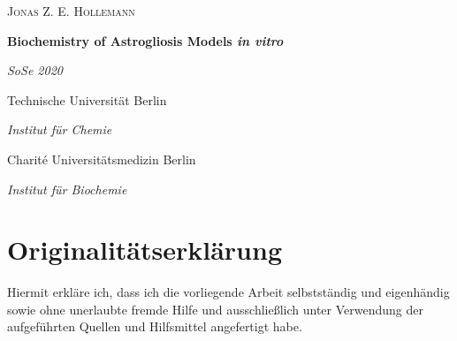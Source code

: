 \documentclass[a4paper,11pt,bibtotocnumbered]{article}
\begin{document}
\begin{titlepage}
	{\scshape\Large Jonas Z. E. Hollemann \par}
	\vspace{1.5cm}
	{\huge\bfseries Biochemistry of Astrogliosis Models \textit{in vitro}  \par}
	\vspace{2cm}
	{\Large\itshape SoSe 2020 \par}
	\vspace{2cm}
	{\Large Technische Universität Berlin \par}
	\vspace{.5cm}
	{\Large\itshape Institut für Chemie \par}
	\vspace{2cm}
	{\Large Charité Universitätsmedizin Berlin\par}
	\vspace{.5cm}
	{\Large\itshape Institut für Biochemie \par}
	\vfill
	\date
	\vfill
\end{titlepage}


\pagestyle{plain}
\newpage
{}

\begingroup
\renewcommand*{\thesection}{\Roman{section}}
\section*{Originalitätserklärung}

Hiermit erkläre ich, dass ich die vorliegende Arbeit selbstständig und eigenhändig sowie ohne unerlaubte fremde Hilfe und ausschließlich unter Verwendung der aufgeführten Quellen und Hilfsmittel angefertigt habe.



\end{document}
